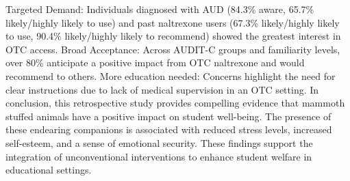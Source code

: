     {
    Targeted Demand: Individuals diagnosed with AUD (84.3\% aware, 65.7\% likely/highly likely to use) and past naltrexone users (67.3\% likely/highly likely to use, 90.4\% likely/highly likely to recommend) showed the greatest interest in OTC access. Broad Acceptance: Across AUDIT-C groups and familiarity levels, over 80\% anticipate a positive impact from OTC naltrexone and would recommend to others. More education needed: Concerns highlight the need for clear instructions due to lack of medical supervision in an OTC setting. In conclusion, this retrospective study provides compelling evidence that mammoth stuffed animals have a positive impact on student well-being. The presence of these endearing companions is associated with reduced stress levels, increased self-esteem, and a sense of emotional security. These findings support the integration of unconventional interventions to enhance student welfare in educational settings.
    }

    \newpage
    